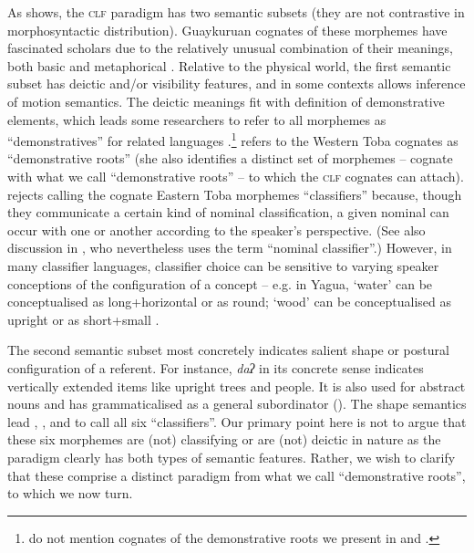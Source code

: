 \documentclass[output=paper,colorlinks,citecolor=brown]{langscibook}
\begin{document}
As  shows, the \textsc{clf} paradigm has two semantic subsets (they are not contrastive in morphosyntactic distribution). Guaykuruan cognates of these morphemes have fascinated scholars due to the relatively unusual combination of their meanings, both basic and metaphorical \citep{Klein1979,MessineoEtAl2016}. Relative to the physical world, the first semantic subset has deictic and/or visibility features, and in some contexts allows inference of motion semantics. The deictic meanings fit with  definition of demonstrative elements, which leads some researchers to refer to all  morphemes as “demonstratives” for related languages \citep{MessineoEtAl2016}.\footnote{\citet{MessineoEtAl2016} do not mention cognates of the demonstrative roots we present in  and .} \citet{Carpio2012} refers to the Western Toba cognates as “demonstrative roots” (she also identifies a distinct set of morphemes – cognate with what we call “demonstrative roots” – to which the \textsc{clf} cognates can attach). \citet[153]{González2015} rejects calling the cognate Eastern Toba morphemes “classifiers” because, though they communicate a certain kind of nominal classification, a given nominal can occur with one or another according to the speaker’s perspective. (See also discussion in \citet[145]{Messineo2003}, who nevertheless uses the term “nominal classifier”.) However, in many classifier languages, classifier choice can be sensitive to varying speaker conceptions of the configuration of a concept – e.g. in Yagua, ‘water’ can be conceptualised as long+horizontal or as round; ‘wood’ can be conceptualised as upright or as short+small \citep{Payne1986}.

The second semantic subset most concretely indicates salient shape or postural configuration of a referent. For instance, \textit{daʔ} in its concrete sense indicates vertically extended items like upright trees and people. It is also used for abstract nouns and has grammaticalised as a general subordinator (). The shape semantics lead \citet{Klein1979}, \citet{Vidal1997,Vidal2001}, and \citet{MessineoCúneo2019} to call all six “classifiers”. Our primary point here is not to argue that these six morphemes are (not) classifying or are (not) deictic in nature as the paradigm clearly has both types of semantic features. Rather, we wish to clarify that these comprise a distinct paradigm from what we call “demonstrative roots”, to which we now turn.
\end{document}
